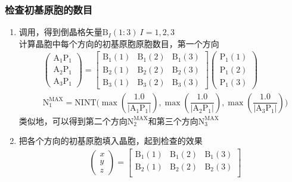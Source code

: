 \documentclass{article}      %
\begin{document}
\subsubsection{检查初基原胞的数目}
\begin{enumerate}
	\item 调用，得到倒晶格矢量$\mathrm{B}_I(1:3)~I=1,2,3$\\
		计算晶胞中每个方向的初基原胞原胞数目，第一个方向
		\begin{displaymath}
			\begin{aligned}
			&\begin{pmatrix}
				\mathrm{A}_1\mathrm{P}_1\\\mathrm{A}_2\mathrm{P}_1\\\mathrm{A}_3\mathrm{P}_1
			\end{pmatrix}=
			\begin{bmatrix}
				\mathrm{B}_1(1) &\mathrm{B}_1(2) &\mathrm{B}_1(3) \\
				\mathrm{B}_2(1) &\mathrm{B}_2(2) &\mathrm{B}_2(3) \\
				\mathrm{B}_3(1) &\mathrm{B}_3(2) &\mathrm{B}_3(3) 
			\end{bmatrix}
			\begin{pmatrix}
				\mathrm{P}_1(1)\\\mathrm{P}_1(2)\\\mathrm{P}_1(3)
			\end{pmatrix}\\
			&\mathrm{N}_1^{\mathrm{MAX}}=\mathrm{NINT}\bigg(\max(\dfrac{1.0}{|\mathrm{A}_1\mathrm{P}_1|}),\max(\dfrac{1.0}{|\mathrm{A}_2\mathrm{P}_1|}),\max(\dfrac{1.0}{|\mathrm{A}_3\mathrm{P}_1|})\bigg)
			\end{aligned}
		\end{displaymath}
		类似地，可以得到第二个方向$\mathrm{N}_2^{\mathrm{MAX}}$和第三个方向$\mathrm{N}_3^{\mathrm{MAX}}$
	\item 把各个方向的初基原胞填入晶胞，起到检查的效果\\
		\begin{displaymath}
			\begin{aligned}
			&\begin{pmatrix}
				x\\y\\z
			\end{pmatrix}=
			\begin{bmatrix}
				\mathrm{B}_1(1) &\mathrm{B}_1(2) &\mathrm{B}_1(3) \\
				\mathrm{B}_2(1) &\mathrm{B}_2(2) &\mathrm{B}_2(3) \\

\end{bmatrix}
\end{aligned}
\end{displaymath}
\end{enumerate}
\end{document}
